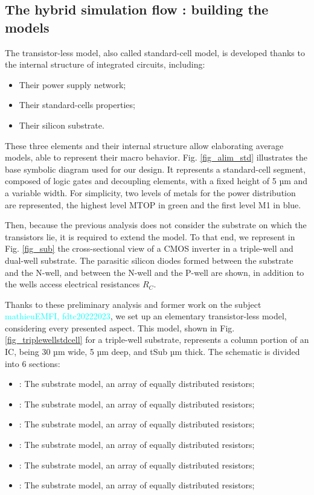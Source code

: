 \subsection{The hybrid simulation flow : building the models}
The transistor-less model, also called standard-cell model, is developed thanks to the internal structure of integrated circuits, including:
\begin{itemize}
	\item Their power supply network;
	\item Their standard-cells properties;
	\item Their silicon substrate.
\end{itemize}
These three elements and their internal structure allow elaborating average models, able to represent their macro behavior.
Fig. \ref{fig_alim_std} illustrates the base symbolic diagram used for our design.
It represents a standard-cell segment, composed of logic gates and decoupling elements, with a fixed height of 5 µm and a variable width.
For simplicity, two levels of metals for the power distribution are represented, the highest level MTOP in green and the first level M1 in blue.

Then, because the previous analysis does not consider the substrate on which the transistors lie, it is required to extend the model.
To that end, we represent in Fig. \ref{fig_sub} the cross-sectional view of a CMOS inverter in a triple-well and dual-well substrate.
The parasitic silicon diodes formed between the substrate and the N-well, and between the N-well and the P-well are shown, in addition to the wells access electrical resistances $R_C$.

Thanks to these preliminary analysis and former work on the subject \textcolor{cyan}{mathieuEMFI, fdtc20222023}, we set up an elementary transistor-less model, considering every presented aspect.
This model, shown in Fig. \ref{fig_triplewellstdcell} for a triple-well substrate, represents a column portion of an IC, being 30 µm wide, 5 µm deep, and tSub µm thick.
The schematic is divided into 6 sections:
\begin{itemize}
	\item {}: The substrate model, an array of equally distributed resistors;
	\item {}: The substrate model, an array of equally distributed resistors;
	\item {}: The substrate model, an array of equally distributed resistors;
	\item {}: The substrate model, an array of equally distributed resistors;
	\item {}: The substrate model, an array of equally distributed resistors;
	\item {}: The substrate model, an array of equally distributed resistors;
\end{itemize}





%
